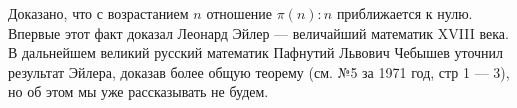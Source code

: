 \documentclass[a4paper, twocolumn]{article}
\begin{document}
\vspace{5mm}

Доказано, что с возрастанием $n$ отношение $\pi(n):n$ приближается к нулю. Впервые этот факт доказал Леонард Эйлер --- величайший математик XVIII века. В дальнейшем великий русский математик Пафнутий Львович Чебышев уточнил результат Эйлера, доказав более общую теорему (см.  №5 за 1971 год, стр 1 --- 3), но об этом мы уже рассказывать не будем.
\end{document}
